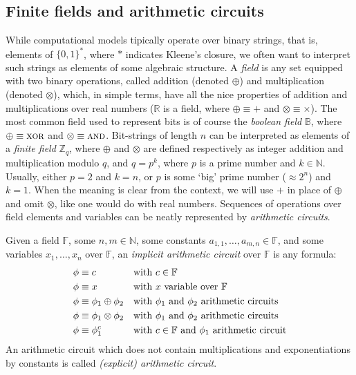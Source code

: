 \subsection{Finite fields and arithmetic circuits}
While computational models tipically operate over binary strings, that is, elements of 
\({\{0, 1\}}^*\), where \(*\) indicates Kleene's closure, we often want to interpret such strings 
as elements of some algebraic structure.
A \emph{field} is any set equipped with two binary operations, called addition
(denoted \(\oplus \)) and multiplication (denoted \(\otimes \)), which, in simple terms, have all
the nice properties of addition and multiplications over real numbers (\(\mathbb{R}\) is a field,
where \(\oplus \equiv +\) and \(\otimes \equiv \times \)).
The most common field used to represent bits is of course the \emph{boolean field} \(\mathbb{B}\),
where \(\oplus \equiv \textsc{xor}\) and \(\otimes \equiv \textsc{and}\).
Bit-strings of length \(n\) can be interpreted as elements of a \emph{finite field}
\(\mathbb{Z}_{q}\), where \(\oplus \) and \(\otimes \) are defined respectively as integer addition
and multiplication modulo \(q\), and \(q = p^k\), where \(p\) is a prime number and
\(k \in \mathbb{N}\).
Usually, either \(p = 2\) and \(k = n\), or \(p\) is some `big' prime number (\(\approx 2^n\)) and
\(k = 1\).
When the meaning is clear from the context, we will use \(+\) in place of \(\oplus \) and
omit \(\otimes \), like one would do with real numbers.
Sequences of operations over field elements and variables can be neatly represented by
\emph{arithmetic circuits}.
\begin{definition}
	Given a field \(\mathbb{F}\), some \(n, m \in \mathbb{N}\), some constants
	\(a_{1, 1}, \dots, a_{m, n} \in \mathbb{F}\), and some variables \(x_1, \dots, x_n \) over
	\(\mathbb{F}\), an \emph{implicit arithmetic circuit} over \(\mathbb{F}\) is any formula:
	\begin{align*}
		 & \phi \equiv c                     &  & \textnormal{with \(c \in \mathbb{F}\)}
		\\
		 & \phi \equiv x                     &  & \textnormal{with \(x\) variable over
			\(\mathbb{F}\)}
		\\
		 & \phi \equiv \phi_1 \oplus \phi_2  &  & \textnormal{with \(\phi_1\) and \(\phi_2\)
			arithmetic
			circuits}
		\\
		 & \phi \equiv \phi_1 \otimes \phi_2 &  & \textnormal{with \(\phi_1\) and \(\phi_2\)
			arithmetic
			circuits}
		\\
		 & \phi \equiv \phi_1^c              &  & \textnormal{with \(c \in \mathbb{F}\) and
			\(\phi_1\) arithmetic
			circuit}
	\end{align*}
	An arithmetic circuit which does not contain multiplications and exponentiations by constants
	is called \emph{(explicit) arithmetic circuit}.
\end{definition}

